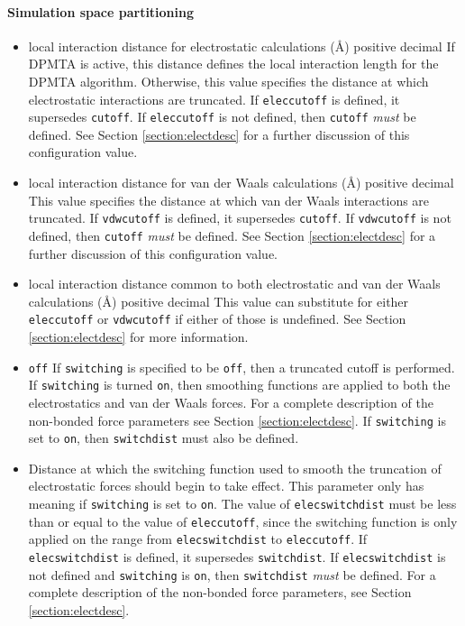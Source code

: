 \paragraph{Simulation space partitioning}

\begin{itemize}
\item
{}%
{local interaction distance for electrostatic calculations (\AA)}%
{positive decimal}%
{If DPMTA is active, this distance defines the local interaction length
for the DPMTA algorithm.
Otherwise, this value specifies the distance at which
electrostatic interactions are truncated.
If \verb!eleccutoff! is defined, it supersedes \verb!cutoff!.
If \verb!eleccutoff! is not defined, then \verb !cutoff! {\em must}
be defined.
See Section \ref{section:electdesc} for a further discussion
of this configuration value.}

\item
{}%
{local interaction distance for van der Waals calculations (\AA)}%
{positive decimal}%
{This value specifies the distance at which
van der Waals interactions are truncated.
If \verb!vdwcutoff! is defined, it supersedes \verb!cutoff!.
If \verb!vdwcutoff! is not defined, then \verb !cutoff! {\em must}
be defined.
See Section \ref{section:electdesc} for a further discussion
of this configuration value.}

\item
{}%
{local interaction distance common to both electrostatic 
and van der Waals calculations (\AA)}%
{positive decimal}%
{This value can substitute for either \verb!eleccutoff!
or \verb!vdwcutoff! if either of those is undefined.
See Section \ref{section:electdesc} for more information.}

\item
{}
{\verb!off!}
{If \verb!switching! is
specified to be \verb!off!, then a truncated cutoff is performed.
If \verb!switching! is turned \verb!on!, then smoothing functions
are applied to both the electrostatics and van der Waals forces.
For a complete description of the non-bonded force parameters see
Section \ref{section:electdesc}.  If \verb!switching! is set to
\verb!on!, then \verb!switchdist! must also be defined.}

\item
{}
{Distance at which the switching function
used to smooth the truncation of
electrostatic forces should begin to take effect.  
This parameter only has meaning if \verb!switching! is 
set to \verb!on!.  
The value of \verb!elecswitchdist! must be less than
or equal to the value of \verb!eleccutoff!, since the switching function
is only applied on the range from \verb!elecswitchdist! to \verb!eleccutoff!.
If \verb!elecswitchdist! is defined, it supersedes \verb!switchdist!.
If \verb!elecswitchdist! is not defined and \verb!switching! is
\verb!on!, then \verb !switchdist! {\em must} be defined.
For a complete description of the non-bonded force parameters, see
Section \ref{section:electdesc}.
}


\end{itemize}
